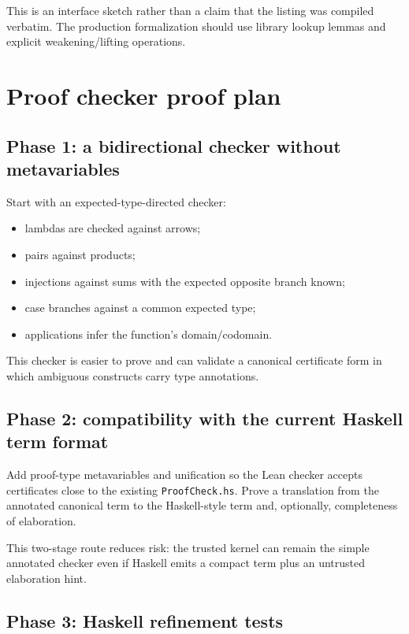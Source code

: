 \documentclass[11pt,letterpaper,openany]{report}
\theoremstyle{definition}
\theoremstyle{remark}
\newcommand{\code}[1]{\texttt{#1}}
\begin{document}
This is an interface sketch rather than a claim that the listing was compiled verbatim. The production formalization should use library lookup lemmas and explicit weakening/lifting operations.

\section{Proof checker proof plan}

\subsection{Phase 1: a bidirectional checker without metavariables}

Start with an expected-type-directed checker:

\begin{itemize}
\item lambdas are checked against arrows;
\item pairs against products;
\item injections against sums with the expected opposite branch known;
\item case branches against a common expected type;
\item applications infer the function's domain/codomain.
\end{itemize}

This checker is easier to prove and can validate a canonical certificate form in which ambiguous constructs carry type annotations.

\subsection{Phase 2: compatibility with the current Haskell term format}

Add proof-type metavariables and unification so the Lean checker accepts certificates close to the existing \code{ProofCheck.hs}. Prove a translation from the annotated canonical term to the Haskell-style term and, optionally, completeness of elaboration.

This two-stage route reduces risk: the trusted kernel can remain the simple annotated checker even if Haskell emits a compact term plus an untrusted elaboration hint.

\subsection{Phase 3: Haskell refinement tests}
\end{document}
